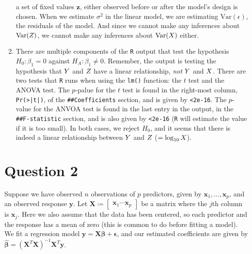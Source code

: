 \documentclass[10pt]{article}
\begin{document}
\begin{enumerate}
    a set of fixed values \(\mathbf{z}\), either observed before or after the model's design is chosen. When we estimate \(\sigma^2\) in 
    the linear model, we are estimating \(\mathrm{Var}(\epsilon)\), the residuals of the model. And since we cannot make any inferences about 
    \(\mathrm{Var}(Z)\), we cannot make any inferences about \(\mathrm{Var}(X)\) either. 
    \item There are multiple components of the \texttt{R} output that test the hypothesis \(H_0 : \beta_1 = 0\) against \(H_A : \beta_1 \neq 0\). 
    Remember, the output is testing the hypothesis that \(Y\) and \(Z\) have a linear relationship, \textsl{not} \(Y\) and \(X\). 
    There are two tests that \texttt{R} runs when using the \texttt{lm()} function: the \(t\) test and the ANOVA test. The \(p\)-palue for the \(t\) test
    is found in the right-most column, \texttt{Pr(>|t|)}, of the \texttt{\#{}\#{}Coefficients} section, and is given by \texttt{<2e-16}. 
    The \(p\)-value for the ANVOA test is found in the last entry in the output, in the \texttt{\#{}\#{}F-statistic} section, and is also given by \texttt{<2e-16}
    (\texttt{R} will estimate the value if it is too small). In both cases, we reject \(H_0\), and it seems that there is indeed a linear relationship 
    between \(Y\) and \(Z\) (\(=\log_{10}X\)). 
\end{enumerate}

\newcommand{\mx}{\mathbf{X}}
\newcommand{\ax}{\widetilde{\mathbf{X}}}
\section{Question 2} \noindent
Suppose we have observed \(n\) observations of \(p\) predictors, given by \(\mathbf{x}_1, \ldots, \mathbf{x}_p\), and an observed response \(\mathbf{y}\).
Let \(\mathbf{X} \coloneqq \begin{bmatrix}
    \mathbf{x}_1 \cdots \mathbf{x}_p
\end{bmatrix}\) be a matrix where the \(j\)th column is \(\mathbf{x}_j\).
Here we also assume that the data has been centered, so each predictor and the response has a mean of zero (this is common to do before fitting a model).
We fit a regression model \(\mathbf{y} = \mathbf{X}\bm{\beta} + \bm{\epsilon}\), and our estimated coefficients are given by 
\(\hat{\bm{\beta}} = (\mathbf{X}^T\mathbf{X})^{-1}\mathbf{X}^T\mathbf{y}\). 
\end{document}
